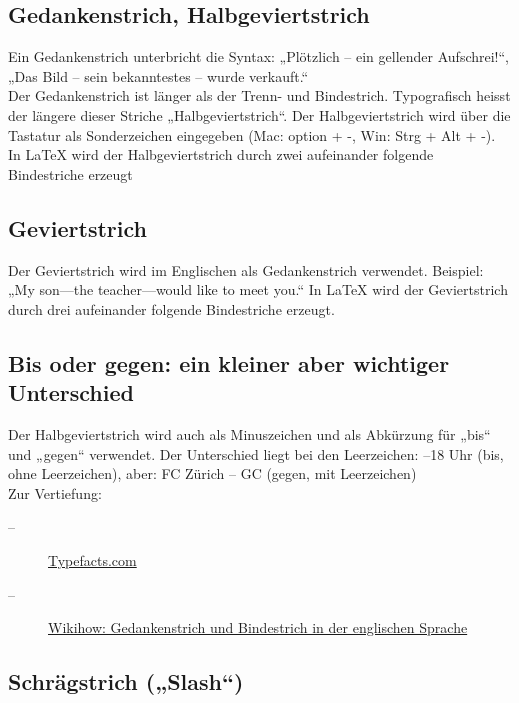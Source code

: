 \subsection{Gedankenstrich, Halbgeviertstrich} 

Ein Gedankenstrich unterbricht die Syntax: „Plötzlich -- 
ein gellender Aufschrei!“, „Das Bild -- sein bekanntestes -- 
wurde verkauft.“ \\

Der Gedankenstrich ist länger als der  Trenn- und Bindestrich. 
Typografisch heisst der längere dieser Striche „Halbgeviertstrich“. 
Der Halbgeviertstrich wird über die Tastatur als Sonderzeichen eingegeben 
(Mac: option + -, Win: Strg + Alt + -). In LaTeX wird der 
Halbgeviertstrich durch zwei aufeinander folgende Bindestriche erzeugt

\subsection{Geviertstrich} 

Der Geviertstrich wird im Englischen als Gedankenstrich verwendet. 
Beispiel: „My son---the teacher---would like to meet you.“ 
In LaTeX wird der Geviertstrich durch drei aufeinander folgende 
Bindestriche erzeugt.

\subsection{Bis oder gegen: ein kleiner aber wichtiger Unterschied}

Der Halbgeviertstrich wird auch als Minuszeichen und als Abkürzung für 
„bis“ und „gegen“ verwendet. Der Unterschied liegt bei den Leerzeichen: 
\hfill {}–18 Uhr (bis, ohne Leerzeichen), aber: FC Zürich – GC 
(gegen, mit Leerzeichen) \\

Zur Vertiefung: 
\begin{description}
  \item[--] \href{https://typefacts.com/artikel/binde-und-gedankenstrich}{Typefacts.com} 
  \item[--] \href{https://de.wikihow.com/Gedankenstrich-und-Bindestrich-in-der-englischen-Sprache}{Wikihow: Gedankenstrich und Bindestrich in der englischen Sprache}
\end{description}

\subsection{Schrägstrich („Slash“)}

